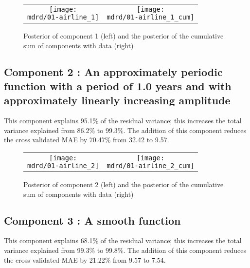 \documentclass{article} %
\begin{document}
\begin{figure}[H]
\newcommand{\wmgd}{0.5\columnwidth}
\newcommand{\hmgd}{3.0cm}
\newcommand{\mdrd}{figures/01-airline}
\newcommand{\mbm}{\hspace{-0.3cm}}
\begin{tabular}{cc}
\mbm \texttt{[image: \\mdrd/01-airline\_1]} & \texttt{[image: \\mdrd/01-airline\_1\_cum]}
\end{tabular}
\caption{Posterior of component 1 (left) and the posterior of the cumulative sum of components with data (right)}
\label{fig:comp1}
\end{figure}

\subsection{Component 2 : An approximately periodic function with a period of 1.0 years and with approximately linearly increasing amplitude}



This component explains 95.1\% of the residual variance; this increases the total variance explained from 86.2\% to 99.3\%.
The addition of this component reduces the cross validated MAE by 70.47\% from 32.42 to 9.57.


\begin{figure}[H]
\newcommand{\wmgd}{0.5\columnwidth}
\newcommand{\hmgd}{3.0cm}
\newcommand{\mdrd}{figures/01-airline}
\newcommand{\mbm}{\hspace{-0.3cm}}
\begin{tabular}{cc}
\mbm \texttt{[image: \\mdrd/01-airline\_2]} & \texttt{[image: \\mdrd/01-airline\_2\_cum]}
\end{tabular}
\caption{Posterior of component 2 (left) and the posterior of the cumulative sum of components with data (right)}
\label{fig:comp2}
\end{figure}

\subsection{Component 3 : A smooth function}



This component explains 68.1\% of the residual variance; this increases the total variance explained from 99.3\% to 99.8\%.
The addition of this component reduces the cross validated MAE by 21.22\% from 9.57 to 7.54.
\end{document}

